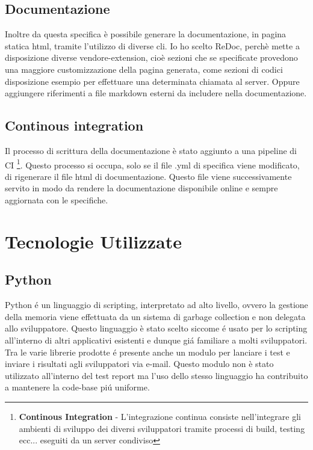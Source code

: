             \subsection{Documentazione\label{apidoc}}
                Inoltre da questa specifica è possibile generare la documentazione, in pagina statica html,
                tramite l'utilizzo di diverse cli.
                Io ho scelto ReDoc, perchè mette a disposizione diverse vendore-extension, cioè sezioni che
                se specificate provedono una maggiore customizzazione della pagina generata, come sezioni di codici disposizione
                esempio per effettuare una determinata chiamata al server.
                Oppure aggiungere riferimenti a file markdown esterni da includere nella documentazione.
                
            \subsection{Continous integration}
                Il processo di scrittura della documentazione è stato aggiunto a una pipeline di CI
                \footnote{\textbf{Continous Integration} - L'integrazione continua consiste nell'integrare gli ambienti di sviluppo dei diversi sviluppatori tramite processi di build, testing ecc... eseguiti da un server condiviso}.
                Questo processo si occupa, solo se il file .yml di specifica viene modificato, di 
                rigenerare il file html di documentazione.
                Questo file viene successivamente servito in modo da rendere la documentazione 
                disponibile online e sempre aggiornata con le specifiche.

    \section{Tecnologie Utilizzate}  
        \subsection{Python}
            Python \'e un linguaggio di scripting, interpretato ad alto livello, ovvero la gestione della memoria viene effettuata da un sistema di garbage collection e non delegata allo sviluppatore.
            Questo linguaggio è stato scelto siccome \'e usato per lo scripting all'interno di altri applicativi esistenti e dunque gi\'a familiare a molti sviluppatori.
            Tra le varie librerie prodotte \'e presente anche un modulo per lanciare i test e inviare i risultati agli sviluppatori via e-mail.
            Questo modulo non è stato utilizzato all'interno del test report ma l'uso dello stesso linguaggio ha contribuito a mantenere la code-base pi\'u uniforme.
